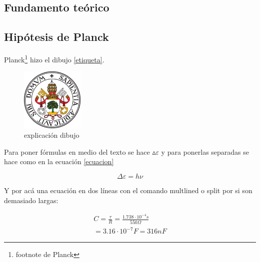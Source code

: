 \documentclass[12pt,a4paper]{article}
\begin{document}
\begin{multicols}{2} %

\section{Fundamento teórico}
\subsection{Hipótesis de Planck}
Planck\footnote{footnote de Planck} hizo el dibujo \eqref{etiqueta}.

\begin{figure}[H]
\centering
\includegraphics[width=3cm]{fotos/escudo}
\caption{explicación dibujo \cite{referencia}}
\label{etiqueta}
\end{figure}

Para poner fórmulas en medio del texto se hace ${\vartriangle}\varepsilon$ y para ponerlas separadas se hace como en la ecuación \eqref{ecuacion}

\begin{equation}
\Delta\varepsilon=h\nu
\label{ecuacion}
\end{equation} %

Y por acá una ecuación en dos líneas con el comando multlined o split por si son demasiado largas:

\begin{equation*}
\begin{multlined}
C=\frac{\tau}{R}=\frac{1.738\cdot10^{-4}s}{550\Omega}\\
=3.16\cdot10^{-7}F=316nF
\end{multlined}
\end{equation*}


\end{multicols}
\end{document}
